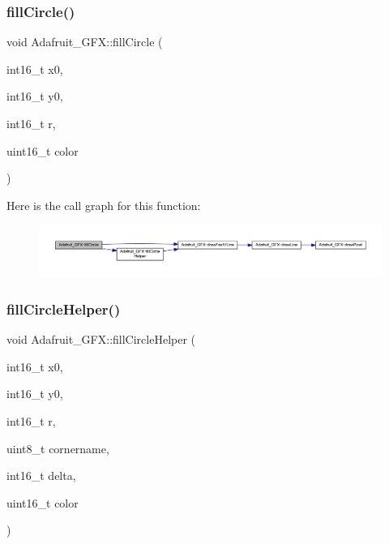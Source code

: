 \subsubsection{\texorpdfstring{fill\+Circle()}{fillCircle()}}
{\footnotesize\ttfamily void Adafruit\+\_\+\+G\+F\+X\+::fill\+Circle (\begin{DoxyParamCaption}\item[{int16\+\_\+t}]{x0,  }\item[{int16\+\_\+t}]{y0,  }\item[{int16\+\_\+t}]{r,  }\item[{uint16\+\_\+t}]{color }\end{DoxyParamCaption})}

Here is the call graph for this function\+:
\nopagebreak
\begin{figure}[H]
\begin{center}
\leavevmode
\includegraphics[width=350pt]{d9/d97/class_adafruit___g_f_x_a623e031e58492fb41e9fde6a05d97c12_cgraph}
\end{center}
\end{figure}
\mbox{\label{class_adafruit___g_f_x_a2242d3560b08c6480084152b6660052a}} 
\subsubsection{\texorpdfstring{fill\+Circle\+Helper()}{fillCircleHelper()}}
{\footnotesize\ttfamily void Adafruit\+\_\+\+G\+F\+X\+::fill\+Circle\+Helper (\begin{DoxyParamCaption}\item[{int16\+\_\+t}]{x0,  }\item[{int16\+\_\+t}]{y0,  }\item[{int16\+\_\+t}]{r,  }\item[{uint8\+\_\+t}]{cornername,  }\item[{int16\+\_\+t}]{delta,  }\item[{uint16\+\_\+t}]{color }\end{DoxyParamCaption})}

